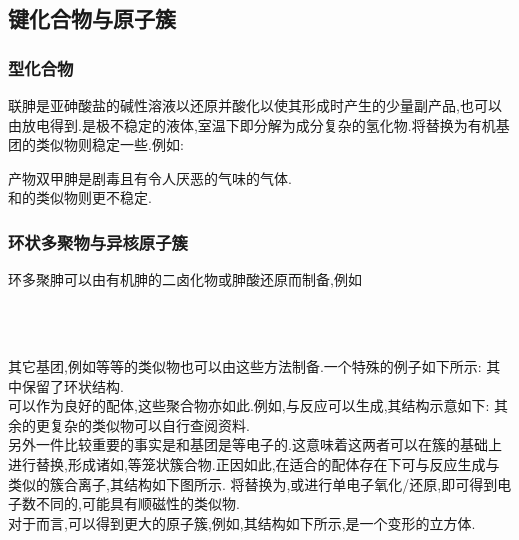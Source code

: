 \documentclass{ctexart}
\begin{document}
\subsection{键化合物与原子簇}
\subsubsection{型化合物}
联胂是亚砷酸盐的碱性溶液以还原并酸化以使其形成时产生的少量副产品,也可以由放电得到.是极不稳定的液体,室温下即分解为成分复杂的氢化物.将替换为有机基团的类似物则稳定一些.例如:
\begin{center}
\end{center}
产物双甲胂是剧毒且有令人厌恶的气味的气体.\\
\indent {}和的类似物则更不稳定.
\subsubsection{环状多聚物与异核原子簇}
环多聚胂可以由有机胂的二卤化物或胂酸还原而制备,例如
\begin{center}
    \\
    \ \ \ \ \ \\
\end{center}
其它基团,例如等等的类似物也可以由这些方法制备.一个特殊的例子如下所示:
其中保留了\ce{[As3]}环状结构.\\
\indent {}可以作为良好的配体,这些聚合物亦如此.例如,与反应可以生成,其结构示意如下:
其余的更复杂的类似物可以自行查阅资料.\\
\indent 另外一件比较重要的事实是和基团是等电子的.这意味着这两者可以在\ce{[As4]}簇的基础上进行替换,形成诸如,等笼状簇合物.正因如此,在适合的配体存在下可与反应生成与类似的簇合离子,其结构如下图所示.
将替换为,或进行单电子氧化/还原,即可得到电子数不同的,可能具有顺磁性的类似物.\\
\indent 对于而言,可以得到更大的原子簇,例如,其结构如下所示,是一个变形的立方体.
\end{document}
